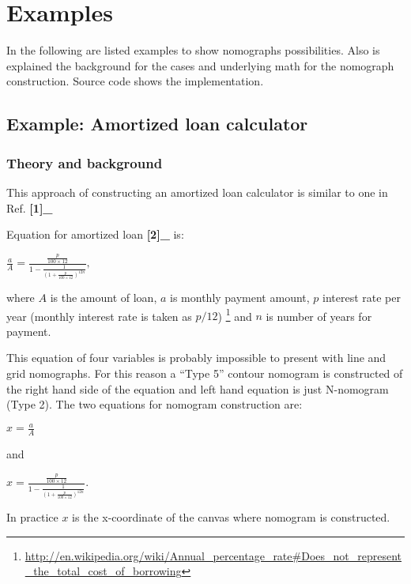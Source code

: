 \documentclass[a4paper,11pt,english]{sphinxmanual}
\begin{document}
\chapter{Examples}
\label{examples/examples::doc}\label{examples/examples:examples}
In the following are listed examples to show  nomographs possibilities.  Also is explained the background for the cases
and underlying math for the nomograph construction. Source code shows the implementation.


\section{Example: Amortized loan calculator}
\label{examples/examples:example-amortized-loan-calculator}

\subsection{Theory and background}
\label{examples/examples:theory-and-background}
This approach of constructing an amortized loan calculator is similar to
one in Ref.  {\color{red}\bfseries{}{[}1{]}\_}

Equation for amortized loan  {\color{red}\bfseries{}{[}2{]}\_} is:

\(\frac{a}{A} = \frac{\frac{p}{100\times 12}}{1-\frac{1}{(1+\frac{p}{100\times 12})^{12n}}},\)

where \(A\) is the amount of loan, \(a\) is monthly payment
amount, \(p\) interest rate per year (monthly interest rate is taken
as \(p/12\)) \footnote[3]{
\href{http://en.wikipedia.org/wiki/Annual\_percentage\_rate\#Does\_not\_represent\_the\_total\_cost\_of\_borrowing}{http://en.wikipedia.org/wiki/Annual\_percentage\_rate\#Does\_not\_represent\_the\_total\_cost\_of\_borrowing}
} and \(n\) is number of years for payment.

This equation of four variables is probably impossible to present with
line and grid nomographs. For this reason a ``Type 5'' contour nomogram is
constructed of the right hand side of the equation and left hand
equation is just N-nomogram (Type 2). The two equations for nomogram
construction are:

\(x = \frac{a}{A}\)

and

\(x = \frac{\frac{p}{100\times 12}}{1-\frac{1}{(1+\frac{p}{100\times 12})^{12n}}}.\)

In practice \(x\) is the x-coordinate of the canvas where nomogram
is constructed.
\end{document}
